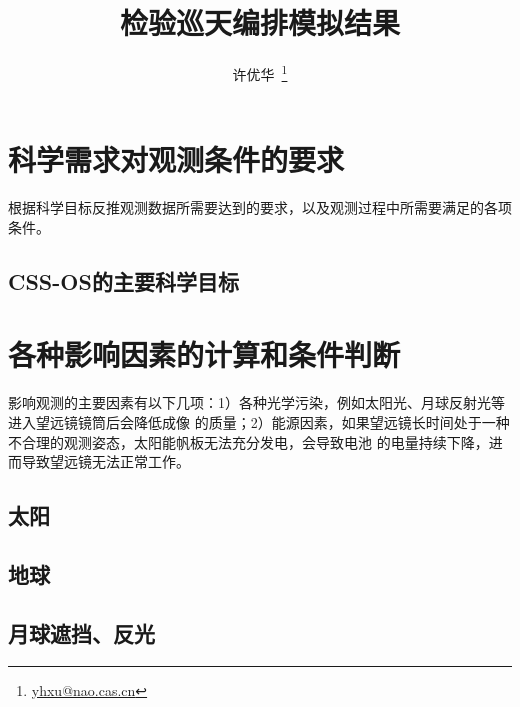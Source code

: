 \documentclass[a4paper,10pt,twocolumn,hyperref]{ctexart}
\begin{document}
\title{检验巡天编排模拟结果}

\author{许优华~\footnote{\url{yhxu@nao.cas.cn}}}


\maketitle


\section{科学需求对观测条件的要求}

根据科学目标反推观测数据所需要达到的要求，以及观测过程中所需要满足的各项条件。

\subsection{CSS-OS的主要科学目标}

\section{各种影响因素的计算和条件判断}
影响观测的主要因素有以下几项：1）各种光学污染，例如太阳光、月球反射光等进入望远镜镜筒后会降低成像
的质量；2）能源因素，如果望远镜长时间处于一种不合理的观测姿态，太阳能帆板无法充分发电，会导致电池
的电量持续下降，进而导致望远镜无法正常工作。

\subsection{太阳}

\subsection{地球}

\subsection{月球遮挡、反光}
\end{document}
